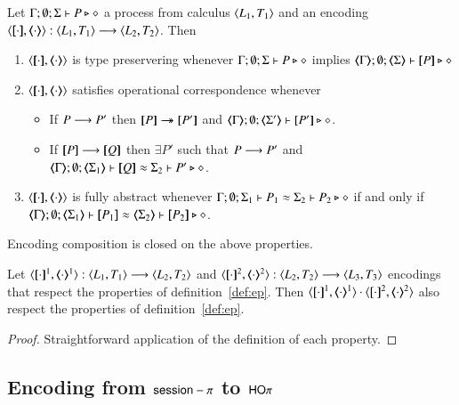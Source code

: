 \begin{definition}
	\label{def:ep}
	Let $\Gamma; \emptyset; \Sigma \vdash P \triangleright \diamond$ 
	a process from calculus $\langle L_1, T_1 \rangle$
	and an encoding 
	$\enc{\cdot}{\cdot}: \calc{L_1}{T_1} \longrightarrow \calc{L_2}{T_2}$.
	Then
	\begin{enumerate}
		\item	$\enc{\cdot}{\cdot}$ is type preservering whenever
			$\Gamma; \emptyset; \Sigma \vdash P \triangleright \diamond$ implies $\mapt{\Gamma}; \emptyset; \mapt{\Sigma} \proves \map{P} \hastype \Proc$

		\item	$\enc{\cdot}{\cdot}$ satisfies operational correspondence whenever
		\begin{itemize}
			\item	If $P \longrightarrow P'$ then
				$\map{P} \Red \map{P'}$ and
				$\mapt{\Gamma}; \emptyset; \mapt{\Sigma'} \proves \map{P'} \hastype \Proc$.
			\item	If $\map{P} \red \map{Q}$ then
				$\exists P'$ such that $P \longrightarrow P'$ and 
				$\mapt{\Gamma};\emptyset; \mapt{\Sigma_1} \proves \map{Q} \wb \Sigma_2 \proves P' \hastype \Proc$.
		\end{itemize}
		
		\item	$\enc{\cdot}{\cdot}$ is fully abstract whenever
			$\Gamma; \emptyset; \Sigma_1 \vdash P_1 \approx \Sigma_2 \vdash P_2 \triangleright \diamond$ if and only if
			$\mapt{\Gamma}; \emptyset; \mapt{\Sigma_1} \proves \map{P_1} \wb \mapt{\Sigma_2} \proves \map{P_2} \hastype \Proc$.
	\end{enumerate}
\end{definition}

Encoding composition is closed on the above properties.

\begin{proposition}
	Let $\encod{\cdot}{\cdot}{1}: \calc{L_1}{T_1} \longrightarrow \calc{L_2}{T_2}$ and 
	$\encod{\cdot}{\cdot}{2}: \calc{L_2}{T_2} \longrightarrow \calc{L_3}{T_3}$
	encodings that respect the properties of definition~\ref{def:ep}.
	Then $\encod{\cdot}{\cdot}{1} \cdot \encod{\cdot}{\cdot}{2}$
	also respect the properties of definition~\ref{def:ep}.
\end{proposition}

\begin{proof}
	Straightforward application of the definition of each property.
\end{proof}

\subsection{Encoding from $\mathsf{session}-\pi$ to $\mathsf{HO}\pi$}

